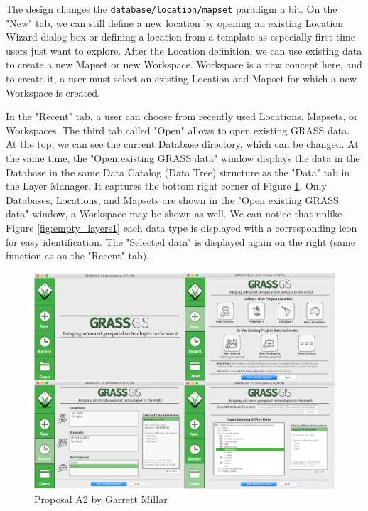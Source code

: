 \documentclass[a4paper,10pt,twoside]{article}
\begin{document}
The design changes the \texttt{database/location/mapset} paradigm a bit. On the "New" tab, we can still define a new location by opening an existing Location Wizard dialog box or defining a location from a template as especially first-time users just want to explore. After the Location definition, we can use existing data to create a new Mapset or new Workspace. Workspace is a new concept here, and to create it, a user must select an existing Location and Mapset for which a new Workspace is created.

In the "Recent" tab, a user can choose from recently used Locations, Mapsets, or Workspaces. The third tab called "Open" allows to open existing GRASS data. At the top, we can see the current Database directory, which can be changed. At the same time, the "Open existing GRASS data" window displays the data in the Database in the same Data Catalog (Data Tree) structure as the "Data" tab in the Layer Manager. It captures the bottom right corner of Figure \ref{fig:proposalA2}. Only Databases, Locations, and Mapsets are shown in the "Open existing GRASS data" window, a Workspace may be shown as well. We can notice that unlike Figure \ref{fig:empty_layers1} each data type is displayed with a corresponding icon for easy identification. The "Selected data" is displayed again on the right (same function as on the "Recent" tab).

\vspace{0.3cm}
\begin{figure}[hbt!] 
\begin{center}
\includegraphics[width=15cm]{pictures/proposalA2.png} 
\caption[Proposal A2 by Garrett Millar]{Proposal A2 by Garrett Millar}
\label{fig:proposalA2}
\end{center}
\end{figure}
\end{document}
